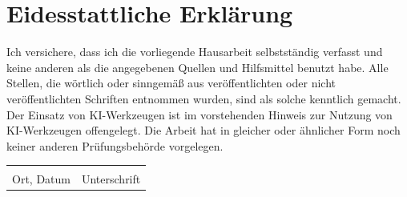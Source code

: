\section*{Eidesstattliche Erkl\"arung}

Ich versichere, dass ich die vorliegende Hausarbeit selbstst\"andig verfasst
und keine anderen als die angegebenen Quellen und Hilfsmittel benutzt habe.
Alle Stellen, die w\"ortlich oder sinngem\"a{\ss} aus ver\"offentlichten oder
nicht ver\"offentlichten Schriften entnommen wurden, sind als solche kenntlich
gemacht. Der Einsatz von KI-Werkzeugen ist im vorstehenden Hinweis zur
Nutzung von KI-Werkzeugen offengelegt. Die Arbeit hat in gleicher oder
\"ahnlicher Form noch keiner anderen Pr\"ufungsbeh\"orde vorgelegen.

\vspace{2cm}
\noindent\begin{tabular}{@{}p{6cm}p{6cm}@{}}
\hrulefill & \hrulefill\\
Ort, Datum & Unterschrift\\
\end{tabular}
